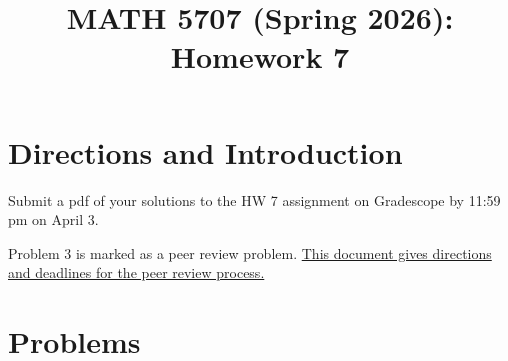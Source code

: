 \documentclass[12pt]{article}
\title{MATH 5707 (Spring 2026): Homework 7}
\date{}
\begin{document}
\vspace{-0.7in}

\maketitle
\vspace{-0.6in}


\section*{Directions and Introduction}
Submit a pdf of your solutions to the HW 7 assignment on Gradescope by 11:59 pm on April 3.

Problem 3 is marked as a peer review problem. \href{https://docs.google.com/document/d/1jSw9pmMJJFUx_6dTkcUi4k4HJNIrrIIgs9zdWhAycx0/edit?usp=sharing}{This document gives directions and deadlines for the peer review process.}



\section*{Problems}
\end{document}
